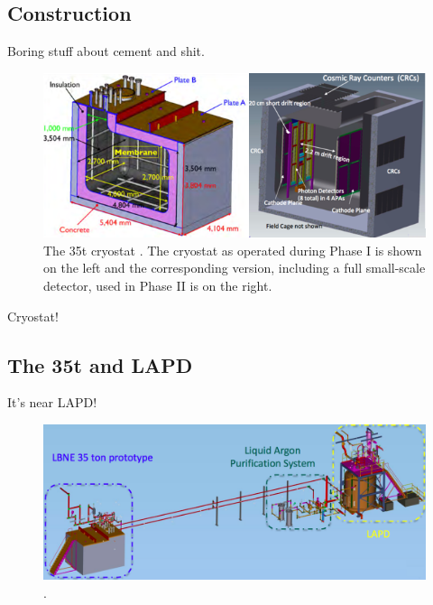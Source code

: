 \subsection{Construction}\label{sec:35tCryostatConstruction}

Boring stuff about cement and shit.

\begin{figure}[ht]
  \centering
  \includegraphics[width=15cm]{35tCryostat.png}
  \caption{The 35t cryostat \cite{LBNE35tPhaseI}.  The cryostat as operated during Phase I is shown on the left and the corresponding version, including a full small-scale detector, used in Phase II is on the right.}
  \label{fig:35tCryostat}
\end{figure}

Cryostat!

\subsection{The 35t and LAPD}\label{35tLAPD}

It's near LAPD!

\begin{figure}[ht]
  \centering
  \includegraphics[width=15cm]{35tLAPD.png}
  \caption{\cite{LBNE35tPhaseI}.}
  \label{fig:35tLAPD}
\end{figure}

